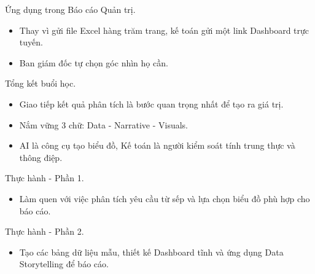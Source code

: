 \documentclass[aspectratio=169]{beamer}
\begin{document}
\begin{frame}{Ứng dụng trong Báo cáo Quản trị.}
    \begin{itemize}
        \item Thay vì gửi file Excel hàng trăm trang, kế toán gửi một link Dashboard trực tuyến.
        \item Ban giám đốc tự chọn góc nhìn họ cần.
    \end{itemize}
\end{frame}


\begin{frame}{Tổng kết buổi học.}
    \begin{itemize}
        \item Giao tiếp kết quả phân tích là bước quan trọng nhất để tạo ra giá trị.
        \item Nắm vững 3 chữ: Data - Narrative - Visuals.
        \item AI là công cụ tạo biểu đồ, Kế toán là người kiểm soát tính trung thực và thông điệp.
    \end{itemize}
\end{frame}


\begin{frame}{Thực hành - Phần 1.}
    \begin{itemize}
        \item Làm quen với việc phân tích yêu cầu từ sếp và lựa chọn biểu đồ phù hợp cho báo cáo.
    \end{itemize}
\end{frame}


\begin{frame}{Thực hành - Phần 2.}
    \begin{itemize}
        \item Tạo các bảng dữ liệu mẫu, thiết kế Dashboard tĩnh và ứng dụng Data Storytelling để báo cáo.
    \end{itemize}
\end{frame}
\end{document}
